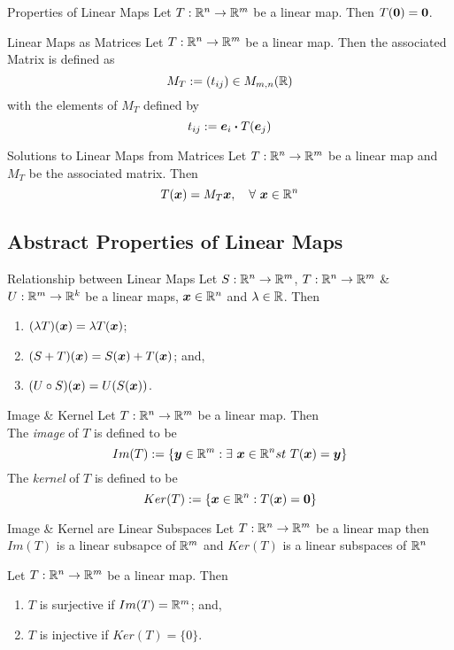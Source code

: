 \documentclass[11pt,a4paper]{article}
\begin{document}
\subtitle{Theorem 5.02 - }{Properties of Linear Maps}
Let $T : \mathbb{R}^n \to \mathbb{R}^m$ be a linear map. Then $T(\boldsymbol{0}) = \boldsymbol{0}$. \\

\subtitle{Definiton 5.03 - }{Linear Maps as Matrices}
Let $T : \mathbb{R}^n \to \mathbb{R}^m$ be a linear map. Then the associated Matrix is defined as
$$M_T := (t_{ij}) \in M_{m,n}(\mathbb{R})$$
with the elements of $M_T$ defined by
$$t_{ij} := \boldsymbol{e}_i \boldsymbol{\cdot} T(\boldsymbol{e}_j)$$

\subtitle{Theorem 5.04 - }{Solutions to Linear Maps from Matrices}
Let $T : \mathbb{R}^n \to \mathbb{R}^m$ be a linear map and $M_T$ be the associated matrix. Then $$T(\boldsymbol{x}) = M_T\boldsymbol{x},\quad \forall\ \boldsymbol{x} \in \mathbb{R}^n$$

\subsection{Abstract Properties of Linear Maps}
%
\subtitle{Theorem 5.05 - }{Relationship between Linear Maps}
Let $S : \mathbb{R}^n \to \mathbb{R}^m$, $T : \mathbb{R}^n \to \mathbb{R}^m$ \& $U : \mathbb{R}^m \to \mathbb{R}^k$ be a linear maps, $\boldsymbol{x} \in \mathbb{R}^n$ and $\lambda \in \mathbb{R}$. Then
\begin{enumerate}[label=\roman*)]
  \item $(\lambda T)(\boldsymbol{x}) = \lambda T(\boldsymbol{x})$;
  \item $(S + T)(\boldsymbol{x}) = S(\boldsymbol{x}) + T(\boldsymbol{x})$; and,
  \item $(U \circ S)(\boldsymbol{x}) = U(S(\boldsymbol{x}))$.\\
\end{enumerate}

\subtitle{Definition 5.06 - }{Image \& Kernel}
Let $T : \mathbb{R}^n \to \mathbb{R}^m$ be a linear map. Then\\
The \textit{image} of $T$ is defined to be $$Im(T) := \{\boldsymbol{y} \in \mathbb{R}^m : \exists\ \boldsymbol{x} \in \mathbb{R}^n st\ T(\boldsymbol{x}) = \boldsymbol{y}\}$$
The \textit{kernel} of $T$ is defined to be $$Ker(T) := \{\boldsymbol{x} \in \mathbb{R}^n : T(\boldsymbol{x}) = \boldsymbol{0}\}$$

\subtitle{Theorem 5.07 - }{Image \& Kernel are Linear Subspaces}
Let $T : \mathbb{R}^n \to \mathbb{R}^m$ be a linear map then $Im(T)$ is a linear subsapce of $\mathbb{R}^m$ and $Ker(T)$ is a linear subspaces of $\mathbb{R}^n$ \\

\subtitle{Remark 5.08}{}
Let $T : \mathbb{R}^n \to \mathbb{R}^m$ be a linear map. Then
\begin{enumerate}[label=\roman*)]
  \item $T$ is surjective if $Im(T) = \mathbb{R}^m$; and,
  \item $T$ is injective if $Ker(T) = \{ 0\}$.
\end{enumerate}
\end{document}

